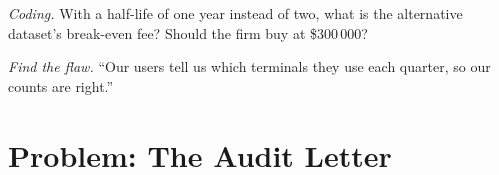 \begin{exercise}[$\star\star\star$]\label{exo:fm:data-strategy-and-costs:7}
\emph{Coding.} With a half-life of one year instead of two, what is the alternative dataset's break-even fee? Should the firm buy at \$300\,000?
\end{exercise}

\begin{exercise}[$\star\star\star$]\label{exo:fm:data-strategy-and-costs:8}
\emph{Find the flaw.} ``Our users tell us which terminals they use each quarter, so our counts are right.''
\end{exercise}

\section{Problem: The Audit Letter}

